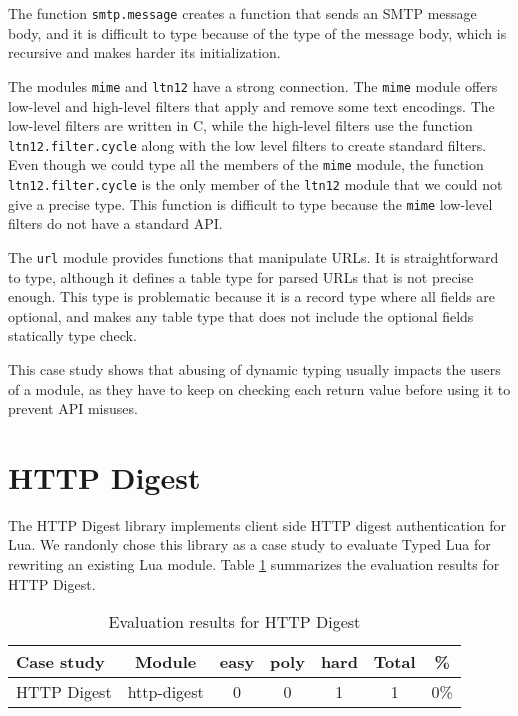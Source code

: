 The function \texttt{smtp.message} creates a function that sends
an SMTP message body, and it is difficult to type because of the
type of the message body, which is recursive and makes harder
its initialization.

The modules \texttt{mime} and \texttt{ltn12} have a strong connection.
The \texttt{mime} module offers low-level and high-level filters
that apply and remove some text encodings.
The low-level filters are written in C, while the high-level filters
use the function \texttt{ltn12.filter.cycle} along with the low level
filters to create standard filters.
Even though we could type all the members of the \texttt{mime} module,
the function \texttt{ltn12.filter.cycle} is the only member of the
\texttt{ltn12} module that we could not give a precise type.
This function is difficult to type because the \texttt{mime} low-level
filters do not have a standard API.

The \texttt{url} module provides functions that manipulate URLs.
It is straightforward to type, although it defines a table type for
parsed URLs that is not precise enough.
This type is problematic because it is a record type where all
fields are optional, and makes any table type that does not include
the optional fields statically type check.

This case study shows that abusing of dynamic typing usually impacts
the users of a module, as they have to keep on checking each return
value before using it to prevent API misuses.

\section{HTTP Digest}

The HTTP Digest library \citep{luahttpdigest} implements client side
HTTP digest authentication for Lua.
We randonly chose this library as a case study to evaluate Typed Lua
for rewriting an existing Lua module.
Table \ref{tab:evalhttpdigest} summarizes the evaluation results for HTTP Digest.

\begin{table}[!ht]
\begin{center}
\begin{tabular}{|l|c|c|c|c|c|c|}
\hline
\textbf{Case study} & \textbf{Module} & \textbf{easy} & \textbf{poly} & \textbf{hard} & \textbf{Total} & \textbf{\%} \\
\hline
\multirow{1}{*}{HTTP Digest}
& http-digest & 0 & 0 & 1 & 1 & 0\% \\
\hline
\end{tabular}
\end{center}
\caption{Evaluation results for HTTP Digest}
\label{tab:evalhttpdigest}
\end{table}

